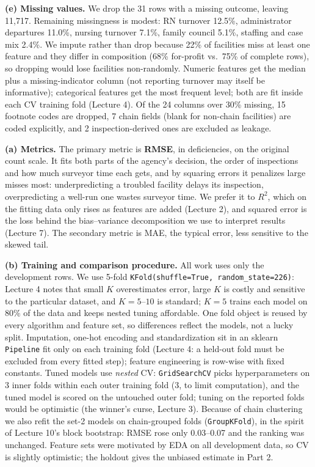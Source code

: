 \documentclass[11pt]{article}
\makeatletter
\renewcommand\section{\@startsection{section}{1}{\z@}{-1.6ex \@plus -.5ex \@minus -.2ex}{0.8ex \@plus .2ex}{\normalfont\large\bfseries}}
\makeatother
\begin{document}
\textbf{(e) Missing values.} We drop the 31 rows with a missing outcome, leaving 11{,}717. Remaining missingness is modest: RN turnover 12.5\%, administrator departures 11.0\%, nursing turnover 7.1\%, family council 5.1\%, staffing and case mix 2.4\%. We impute rather than drop because 22\% of facilities miss at least one feature and they differ in composition (68\% for-profit vs.\ 75\% of complete rows), so dropping would lose facilities non-randomly. Numeric features get the median plus a missing-indicator column (not reporting turnover may itself be informative); categorical features get the most frequent level; both are fit inside each CV training fold (Lecture 4). Of the 24 columns over 30\% missing, 15 footnote codes are dropped, 7 chain fields (blank for non-chain facilities) are coded explicitly, and 2 inspection-derived ones are excluded as leakage.

\section{Prediction}
\textbf{(a) Metrics.} The primary metric is \textbf{RMSE}, in deficiencies, on the original count scale. It fits both parts of the agency's decision, the order of inspections and how much surveyor time each gets, and by squaring errors it penalizes large misses most: underpredicting a troubled facility delays its inspection, overpredicting a well-run one wastes surveyor time. We prefer it to $R^2$, which on the fitting data only rises as features are added (Lecture 2), and squared error is the loss behind the bias--variance decomposition we use to interpret results (Lecture 7). The secondary metric is MAE, the typical error, less sensitive to the skewed tail.

\textbf{(b) Training and comparison procedure.} All work uses only the development rows. We use 5-fold \texttt{KFold(shuffle=True, random\_state=226)}: Lecture 4 notes that small $K$ overestimates error, large $K$ is costly and sensitive to the particular dataset, and $K=5$--$10$ is standard; $K=5$ trains each model on 80\% of the data and keeps nested tuning affordable. One fold object is reused by every algorithm and feature set, so differences reflect the models, not a lucky split. Imputation, one-hot encoding and standardization sit in an sklearn \texttt{Pipeline} fit only on each training fold (Lecture 4: a held-out fold must be excluded from every fitted step); feature engineering is row-wise with fixed constants. Tuned models use \emph{nested} CV: \texttt{GridSearchCV} picks hyperparameters on 3 inner folds within each outer training fold (3, to limit computation), and the tuned model is scored on the untouched outer fold; tuning on the reported folds would be optimistic (the winner's curse, Lecture 3). Because of chain clustering we also refit the set-2 models on chain-grouped folds (\texttt{GroupKFold}), in the spirit of Lecture 10's block bootstrap: RMSE rose only 0.03--0.07 and the ranking was unchanged. Feature sets were motivated by EDA on all development data, so CV is slightly optimistic; the holdout gives the unbiased estimate in Part 2.
\end{document}
